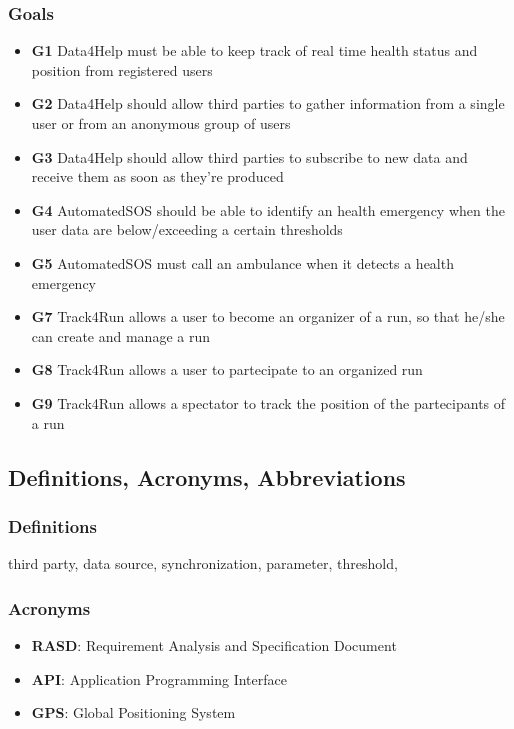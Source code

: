 \subsubsection{Goals}
\begin{itemize}
\item \textbf{G1} Data4Help must be able to keep track of real time health status and position from registered users
\item \textbf{G2} Data4Help should allow third parties to gather information from a single user or from an anonymous group of users
\item \textbf{G3} Data4Help should allow third parties to subscribe to new data and receive them as soon as they're produced
\item \textbf{G4} AutomatedSOS should be able to identify an health emergency when the user data are below/exceeding a certain thresholds
\item \textbf{G5} AutomatedSOS must call an ambulance when it detects a health emergency
\item \textbf{G7} Track4Run allows a user to become an organizer of a run, so that he/she can create and manage a run
\item \textbf{G8} Track4Run allows a user to partecipate to an organized run
\item \textbf{G9} Track4Run allows a spectator to track the position of the partecipants of a run 
\end{itemize}
\subsection{Definitions, Acronyms, Abbreviations}
\subsubsection{Definitions}
third party, data source, synchronization, parameter, threshold,

\subsubsection{Acronyms}
\begin{itemize}
\item \textbf{RASD}: Requirement Analysis and Specification Document
\item \textbf{API}: Application Programming Interface
\item \textbf{GPS}: Global Positioning System
\end{itemize}

